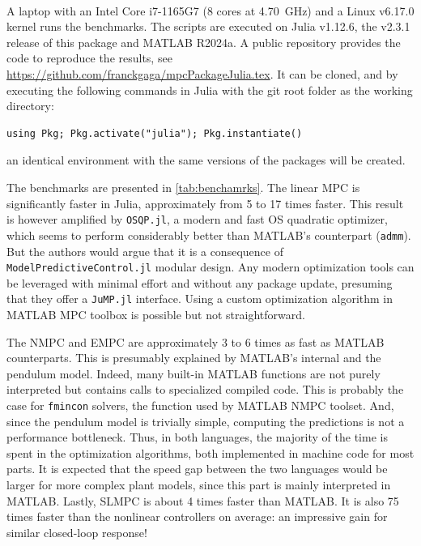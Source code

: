 A laptop with an Intel\textsuperscript{\textregistered} Core\textsuperscript{\texttrademark} i7-1165G7 (8 cores at \SI{4.70}{\giga\hertz}) and a Linux v6.17.0 kernel runs the benchmarks. The scripts are executed on Julia v1.12.6, the v2.3.1 release of this package and MATLAB R2024a. A public repository provides the code to reproduce the results, see \url{https://github.com/franckgaga/mpcPackageJulia.tex}.
It can be cloned, and by executing the following commands in Julia with the git root folder as the working directory:
\begin{verbatim}
using Pkg; Pkg.activate("julia"); Pkg.instantiate()
\end{verbatim}
an identical environment with the same versions of the packages will be created.

\begin{table}[t]
    \centering
    \caption{Julia and MATLAB Benchmarks on the Case Studies.}
    \label{tab:benchamrks}
    \vspace{0.5em}
    \centering
    \footnotesize
    
\end{table}

The benchmarks are presented in \cref{tab:benchamrks}. The linear MPC is significantly faster in Julia, approximately from 5 to 17 times faster. This result is however amplified by \texttt{OSQP.jl}, a modern and fast OS quadratic optimizer, which seems to perform considerably better than MATLAB's counterpart (\texttt{admm}). But the authors would argue that it is a consequence of \texttt{ModelPredictiveControl.jl} modular design. Any modern optimization tools can be leveraged with minimal effort and without any package update, presuming that they offer a \texttt{JuMP.jl} interface. Using a custom optimization algorithm in MATLAB MPC toolbox is possible but not straightforward.

The NMPC and EMPC are approximately 3 to 6 times as fast as MATLAB counterparts. This is presumably explained by MATLAB's internal and the pendulum model. Indeed, many built-in MATLAB functions are not purely interpreted but contains calls to specialized compiled code. This is probably the case for \texttt{fmincon} solvers, the function used by MATLAB NMPC toolset. And, since the pendulum model is trivially simple, computing the predictions is not a performance bottleneck. Thus, in both languages, the majority of the time is spent in the optimization algorithms, both implemented in machine code for most parts. It is expected that the speed gap between the two languages would be larger for more complex plant models, since this part is mainly interpreted in MATLAB. Lastly, SLMPC is about 4 times faster than MATLAB. It is also 75 times faster than the nonlinear controllers on average: an impressive gain for similar closed-loop response!